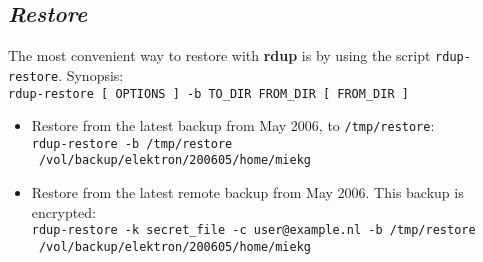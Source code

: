 \documentclass[a4paper, openany]{blocksbook}
\newcommand{\rdup}{\textbf{rdup}}
\newcommand{\cmd}[1]{\texttt{#1}}
\newcommand{\path}[1]{\texttt{#1}}
\begin{document}
\subsection*{\textit{Restore}}
The most convenient way to restore with \rdup{} is by using
the script \cmd{rdup-restore}. Synopsis:\\
\cmd{rdup-restore [ OPTIONS ] -b TO\_DIR FROM\_DIR [ FROM\_DIR ]}
\begin{itemize}
\item
Restore from the latest backup from May 2006, to \path{/tmp/restore}:\\
\cmd{rdup-restore -b /tmp/restore \\\
/vol/backup/elektron/200605/home/miekg}
\item
Restore from the latest remote backup from May 2006. This backup
is encrypted:\\
\cmd{rdup-restore -k secret\_file -c user@example.nl -b /tmp/restore \\\
/vol/backup/elektron/200605/home/miekg}
\end{itemize}
\end{document}
